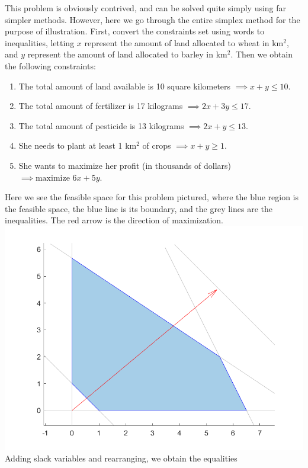 \documentclass[10pt]{article}
\newenvironment{answerblock}[1]{\tcolorbox[beamer,noparskip,breakable,title={#1}]}{\endtcolorbox}
\begin{document}
\begin{answerblock}{Linear Programming Example Evaluation}
	This problem is obviously contrived, and can be solved quite simply using far simpler methods. However, here we go through the entire simplex method for the purpose of illustration. First, convert the constraints set using words to inequalities, letting $x$ represent the amount of land allocated to wheat in km$^2$, and $y$ represent the amount of land allocated to barley in km$^2$. Then we obtain the following constraints:
	\begin{enumerate}
		\item The total amount of land available is 10 square kilometers $\implies x+y\leq 10$.
		\item The total amount of fertilizer is 17 kilograms $\implies 2x+3y \leq 17$.
		\item The total amount of pesticide is 13 kilograms $\implies 2x + y\leq 13$.
		\item She needs to plant at least 1 km$^2$ of crops $\implies x+y \geq 1$.
		\item She wants to maximize her profit (in thousands of dollars) $\implies \textrm{maximize }6x+5y$.
	\end{enumerate}
	Here we see the feasible space for this problem pictured, where the blue region is the feasible space, the blue line is its boundary, and the grey lines are the inequalities. The red arrow is the direction of maximization.
	\includegraphics[width=\textwidth]{images/paper_simplex_problem.png}
	Adding slack variables and rearranging, we obtain the equalities
	\begin{enumerate}

\end{enumerate}
\end{answerblock}
\end{document}
